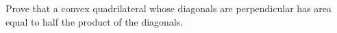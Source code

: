Prove that a convex quadrilateral whose diagonals are perpendicular has area equal to half the product of the diagonals.
